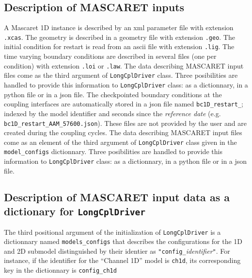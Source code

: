 \subsection{Description of MASCARET inputs}
A Mascaret 1D instance is described by an xml parameter file
with extension \texttt{.xcas}. The geometry is described
in a geometry file with extension \texttt{.geo}.
The initial condition for restart is read from an ascii file with extension \texttt{.lig}.
The time varying boundary conditions are described in several
files (one per condition) with extension \texttt{.loi} or \texttt{.law}. The data describing MASCARET input files come as the third argument of \texttt{LongCplDriver} class.  Three posibilities are handled to provide this information to \texttt{LongCplDriver} class: as a dictionnary, in a python file or in a json file.  The checkpointed boundary conditions at the
coupling interfaces are automatically stored in a json file named
\texttt{bc1D\_restart\_}; indexed by the  model identifier
and seconds since the {\em reference
  date} (e.g. \texttt{bc1D\_restart\_AAM\_57600.json}). These files are
not provided by the user and are created during the coupling cycles.
The data describing MASCARET input files come as an element of the third argument of \texttt{LongCplDriver} class given in the \texttt{model\_configs} dictionnary.  Three posibilities are handled to provide this information to \texttt{LongCplDriver} class: as a dictionnary, in a python file or in a json file.

\subsection{Description of MASCARET input data as a dictionary for \texttt{LongCplDriver}}
The third positional argument of the initialization of
\texttt{LongCplDriver} is a dictionnary named \texttt{models\_configs} that describes the configurations for the 1D and 2D submodel distinguished by their identier as \texttt{"config\_}{\em identifier}\texttt{"}. For instance, if the identifier for the ``Channel 1D'' model is
\texttt{ch1d}, its corresponding key in the dictionnary is \texttt{config\_ch1d}
\newline

